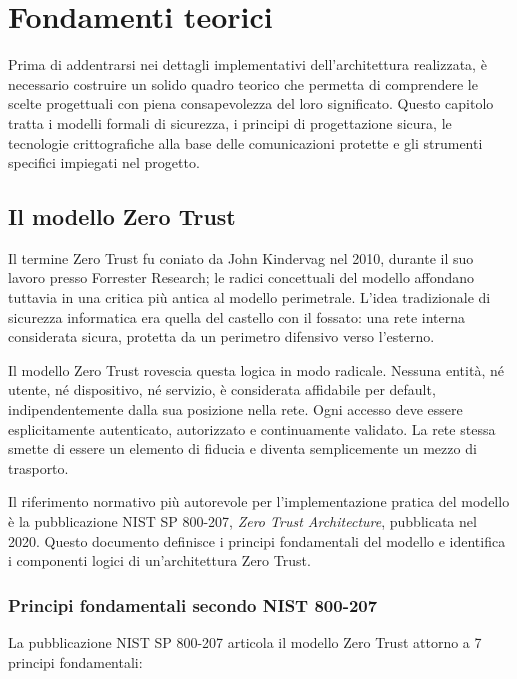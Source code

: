 \chapter{Fondamenti teorici}

Prima di addentrarsi nei dettagli implementativi dell'architettura realizzata, è necessario costruire un solido quadro teorico che permetta di comprendere le scelte progettuali con piena consapevolezza del loro significato. Questo capitolo tratta i modelli formali di sicurezza, i principi di progettazione sicura, le tecnologie crittografiche alla base delle comunicazioni protette e gli strumenti specifici impiegati nel progetto.

\section{Il modello Zero Trust}

Il termine Zero Trust fu coniato da John Kindervag nel 2010, durante il suo lavoro presso Forrester Research; le radici concettuali del modello affondano tuttavia in una critica più antica al modello perimetrale. L'idea tradizionale di sicurezza informatica era quella del castello con il fossato: una rete interna considerata sicura, protetta da un perimetro difensivo verso l'esterno.

Il modello Zero Trust rovescia questa logica in modo radicale. Nessuna entità, né utente, né dispositivo, né servizio, è considerata affidabile per default, indipendentemente dalla sua posizione nella rete. Ogni accesso deve essere esplicitamente autenticato, autorizzato e continuamente validato. La rete stessa smette di essere un elemento di fiducia e diventa semplicemente un mezzo di trasporto.

Il riferimento normativo più autorevole per l'implementazione pratica del modello è la pubblicazione NIST SP 800-207, \textit{Zero Trust Architecture}, pubblicata nel 2020. Questo documento definisce i principi fondamentali del modello e identifica i componenti logici di un'architettura Zero Trust.

\subsection{Principi fondamentali secondo NIST 800-207}

La pubblicazione NIST SP 800-207 articola il modello Zero Trust attorno a 7 principi fondamentali:

